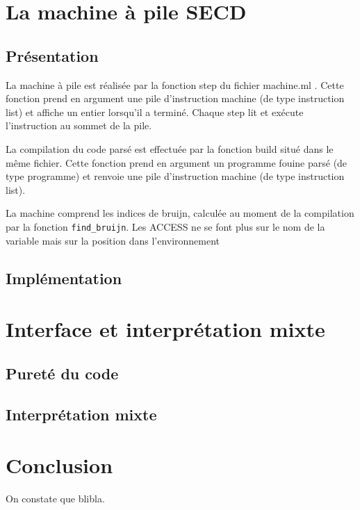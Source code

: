 \section{La machine à pile SECD} %

\subsection{Présentation}

La machine à pile est réalisée par la fonction step du fichier machine.ml . Cette fonction prend en argument une pile d'instruction machine (de type instruction list) et affiche un entier lorsqu'il a terminé. Chaque step lit et exécute l'instruction au sommet de la pile.

La compilation du code parsé est effectuée par la fonction build situé dans le même fichier. Cette fonction prend en argument un programme fouine parsé (de type programme) et renvoie une pile d'instruction machine (de type instruction list).

La machine comprend les indices de bruijn, calculée au moment de la compilation par la fonction \texttt{find\_bruijn}. Les ACCESS ne se font plus sur le nom de la variable mais sur la position dans l'environnement

\subsection{Implémentation}






\section{Interface et interprétation mixte}

\subsection{Pureté du code}

\subsection{Interprétation mixte}



\section*{Conclusion}

On constate que blibla.